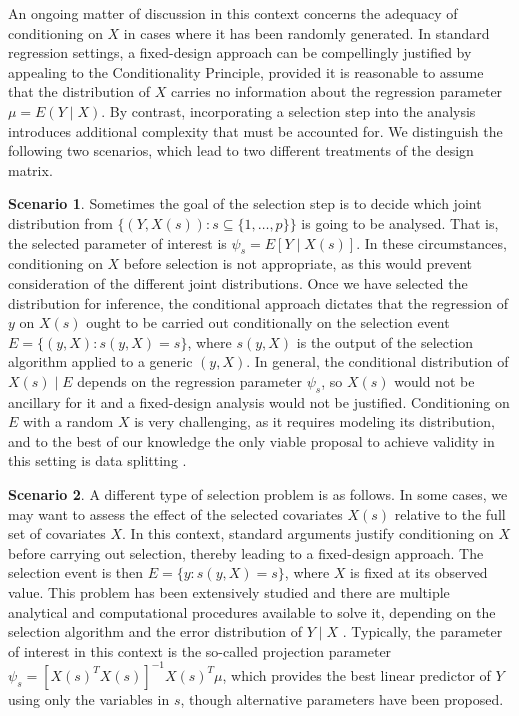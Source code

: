 \documentclass[pdflatex,sn-chicago]{sn-jnl}%
\theoremstyle{thmstyleone}%
\theoremstyle{thmstyletwo}%
\theoremstyle{thmstylethree}%
\begin{document}
An ongoing matter of discussion in this context concerns the adequacy of conditioning on $X$ in cases where it has been randomly generated. In standard regression settings, a fixed-design approach can be compellingly justified by appealing to the Conditionality Principle, provided it is reasonable to assume that the distribution of $X$ carries no information about the regression parameter $\mu = E(Y\mid X)$. By contrast, incorporating a selection step into the analysis introduces additional complexity that must be accounted for. We distinguish the following two scenarios, which lead to two different treatments of the design matrix.

\textbf{Scenario 1}. Sometimes the goal of the selection step is to decide which joint distribution from $\{(Y, X(s))\colon s\subseteq \{1, \ldots, p\}\}$ is going to be analysed. That is, the selected parameter of interest is $\psi_s = E[Y\mid X(s)]$. In these circumstances, conditioning on $X$ before selection is not appropriate, as this would prevent consideration of the different joint distributions. Once we have selected the distribution for inference, the conditional approach dictates that the regression of $y$ on $X(s)$ ought to be carried out conditionally on the selection event $E = \{ (y, X) \colon s(y, X) = s\}$, where $s(y, X)$ is the output of the selection algorithm applied to a generic $(y, X)$. In general, the conditional distribution of $X(s)\mid E$ depends on the regression parameter $\psi_s$, so $X(s)$ would not be ancillary for it and a fixed-design analysis would not be justified. Conditioning on $E$ with a random $X$ is very challenging, as it requires modeling its distribution, and to the best of our knowledge the only viable proposal to achieve validity in this setting is data splitting \citep{rinaldo}.

\textbf{Scenario 2}. A different type of selection problem is as follows. In some cases, we may want to assess the effect of the selected covariates $X(s)$ relative to the full set of covariates $X$. In this context, standard arguments justify conditioning on $X$ before carrying out selection, thereby leading to a fixed-design approach. The selection event is then $E = \{ y \colon s(y, X) = s\}$, where $X$ is fixed at its observed value. This problem has been extensively studied and there are multiple analytical and computational procedures available to solve it, depending on the selection algorithm and the error distribution of $Y\mid X$ \citep{leetaylor, loftustaylor, leeetal, fithianetal, tibsetalboots, panigrahi-integrative, panigrahi-scalable, splitting, blackbox}. Typically, the parameter of interest in this context is the so-called projection parameter $\psi_s = [X(s)^TX(s)]^{-1}X(s)^T\mu$, which provides the best linear predictor of $Y$ using only the variables in $s$, though alternative parameters have been proposed.
\end{document}
